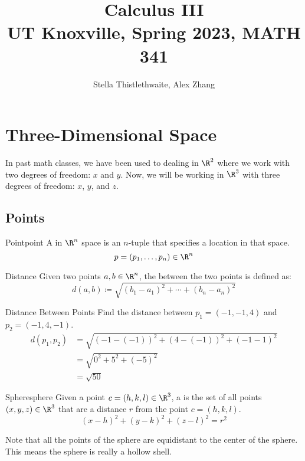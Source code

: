 \documentclass[math]{amznotes}
\title{\textbf{Calculus III}\\
\large UT Knoxville, Spring 2023, MATH 341}
\author{Stella Thistlethwaite, Alex Zhang}
\begin{document}
\maketitle

\tableofcontents

\chapter{Three-Dimensional Space}
In past math classes, we have been used to dealing in $\R^2$ where we work with two degrees of freedom: $x$ and $y$. Now, we will be working in $\R^3$ with three degrees of freedom: $x$, $y$, and $z$.

\section{Points}

\begin{dfnbox}{Point}{point}
    A  in $\R^n$ space is an $n$-tuple that specifies a location in that space.
    \tcblower
    \[ p = (p_1, \ldots, p_n) \in \R^n \]
\end{dfnbox}

\begin{dfnbox}{Distance}{}
    Given two points $a, b\in \R^n$, the  between the two points is defined as:
    \[ d(a, b) \coloneq \sqrt{ (b_1 - a_1)^2 + \cdots + (b_n - a_n)^2} \]
\end{dfnbox}

\begin{exbox}{Distance Between Points}{}
    Find the distance between $p_1 = (-1, -1, 4)$ and $p_2 = (-1, 4, -1)$.
    \tcblower
    \begin{align*}
         d(p_1, p_2) &= \sqrt{ (-1-(-1))^2 + (4-(-1))^2 + (-1-1)^2 } \\
         &= \sqrt{ 0^2 + 5^2 + (-5)^2 } \\
         &= \sqrt{ 50 }
    \end{align*}
\end{exbox}

\begin{dfnbox}{Sphere}{sphere}
    Given a point $c = (h, k, l) \in \R^3$, a  is the set of all points $(x,y,z) \in \R^3$ that are a distance $r$ from the point $c = (h,k,l)$.
    \tcblower
    \[ (x-h)^2 + (y-k)^2 + (z-l)^2 = r^2 \]
\end{dfnbox}

Note that all the points of the sphere are equidistant to the center of the sphere. This means the sphere is really a hollow shell.
\end{document}
